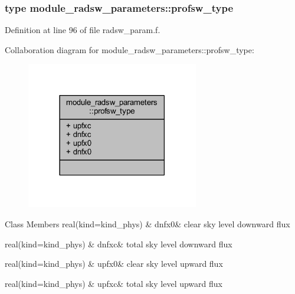 \subsubsection{type module\+\_\+radsw\+\_\+parameters\+:\+:profsw\+\_\+type}


Definition at line 96 of file radsw\+\_\+param.\+f.



Collaboration diagram for module\+\_\+radsw\+\_\+parameters\+:\+:profsw\+\_\+type\+:\nopagebreak
\begin{figure}[H]
\begin{center}
\leavevmode
\includegraphics[width=213pt]{structmodule__radsw__parameters_1_1profsw__type__coll__graph}
\end{center}
\end{figure}
\begin{DoxyFields}{Class Members}
real(kind=kind\+\_\+phys)\hypertarget{namespacemodule__radsw__parameters_aff3ff3155ed05a18fa7caba351d1c503}{}\label{namespacemodule__radsw__parameters_aff3ff3155ed05a18fa7caba351d1c503}
&
dnfx0&
clear sky level downward flux \\
\hline

real(kind=kind\+\_\+phys)\hypertarget{namespacemodule__radsw__parameters_a4d253ac17ae97351a0a3eb15ab4d55e4}{}\label{namespacemodule__radsw__parameters_a4d253ac17ae97351a0a3eb15ab4d55e4}
&
dnfxc&
total sky level downward flux \\
\hline

real(kind=kind\+\_\+phys)\hypertarget{namespacemodule__radsw__parameters_aa9205ed3a95d61dd8e4e7184fd6da43e}{}\label{namespacemodule__radsw__parameters_aa9205ed3a95d61dd8e4e7184fd6da43e}
&
upfx0&
clear sky level upward flux \\
\hline

real(kind=kind\+\_\+phys)\hypertarget{namespacemodule__radsw__parameters_a5122ef2eef4e86a7aadf77114da4b3e2}{}\label{namespacemodule__radsw__parameters_a5122ef2eef4e86a7aadf77114da4b3e2}
&
upfxc&
total sky level upward flux \\
\hline

\end{DoxyFields}
\label{structmodule__radsw__parameters_1_1cmpfsw__type}
\hypertarget{namespacemodule__radsw__parameters_structmodule__radsw__parameters_1_1cmpfsw__type}{}
